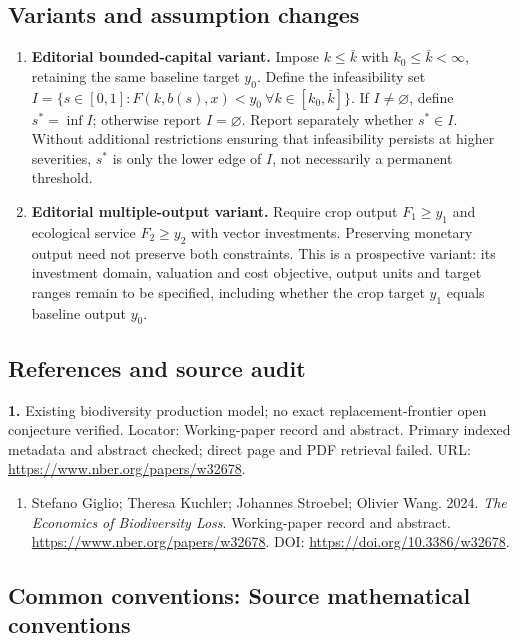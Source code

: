 \documentclass[11pt,a4paper]{article}
\begin{document}
\subsection*{Variants and assumption changes}
\begin{enumerate}
\item \textbf{Editorial bounded-capital variant.} Impose \(k\leq\bar k\) with \(k_0\leq\bar k<\infty\), retaining the same baseline target \(y_0\). Define the infeasibility set \(I=\{s\in[0,1]:F(k,b(s),x)<y_0\ \forall k\in[k_0,\bar k]\}\). If \(I\neq\varnothing\), define \(s^*=\inf I\); otherwise report \(I=\varnothing\). Report separately whether \(s^*\in I\). Without additional restrictions ensuring that infeasibility persists at higher severities, \(s^*\) is only the lower edge of \(I\), not necessarily a permanent threshold.
\item \textbf{Editorial multiple-output variant.} Require crop output \(F_1\geq y_1\) and ecological service \(F_2\geq y_2\) with vector investments. Preserving monetary output need not preserve both constraints. This is a prospective variant: its investment domain, valuation and cost objective, output units and target ranges remain to be specified, including whether the crop target \(y_1\) equals baseline output \(y_0\).
\end{enumerate}
\subsection*{References and source audit}
\textbf{1.} Existing biodiversity production model; no exact replacement-frontier open conjecture verified. Locator: Working-paper record and abstract. Primary indexed metadata and abstract checked; direct page and PDF retrieval failed. URL: \url{https://www.nber.org/papers/w32678}.
\begin{enumerate}\raggedright
\item\hypertarget{definitions:source:30007718:1}{} Stefano Giglio; Theresa Kuchler; Johannes Stroebel; Olivier Wang. 2024. \emph{The Economics of Biodiversity Loss}. Working-paper record and abstract.
\url{https://www.nber.org/papers/w32678}.
DOI: \url{https://doi.org/10.3386/w32678}.
\end{enumerate}

\subsection*{Common conventions: Source mathematical conventions}
\end{document}
